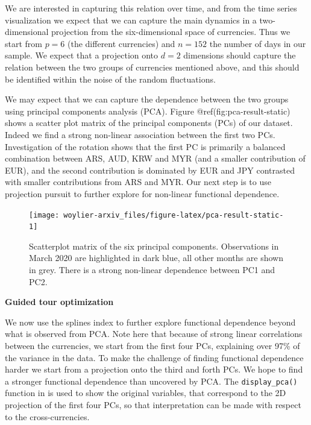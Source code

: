 \documentclass[
]{article}
\begin{document}
We are interested in capturing this relation over time, and from the
time series visualization we expect that we can capture the main
dynamics in a two-dimensional projection from the six-dimensional space
of currencies. Thus we start from \(p=6\) (the different currencies) and
\(n=152\) the number of days in our sample. We expect that a projection
onto \(d=2\) dimensions should capture the relation between the two
groups of currencies mentioned above, and this should be identified
within the noise of the random fluctuations.

We may expect that we can capture the dependence between the two groups
using principal components analysis (PCA). Figure
@ref(fig:pca-result-static) shows a scatter plot matrix of the principal
components (PCs) of our dataset. Indeed we find a strong non-linear
association between the first two PCs. Investigation of the rotation
shows that the first PC is primarily a balanced combination between ARS,
AUD, KRW and MYR (and a smaller contribution of EUR), and the second
contribution is dominated by EUR and JPY contrasted with smaller
contributions from ARS and MYR. Our next step is to use projection
pursuit to further explore for non-linear functional dependence.

\begin{figure}

{\centering \texttt{[image: woylier-arxiv\_files/figure-latex/pca-result-static-1]} 

}

\caption{Scatterplot matrix of the six principal components. Observations in March 2020 are highlighted in dark blue, all other months are shown in grey. There is a strong non-linear dependence between PC1 and PC2.}\label{fig:pca-result-static}
\end{figure}

\textbf{Guided tour optimization}

We now use the splines index to further explore functional dependence
beyond what is observed from PCA. Note here that because of strong
linear correlations between the currencies, we start from the first four
PCs, explaining over 97\% of the variance in the data. To make the
challenge of finding functional dependence harder we start from a
projection onto the third and forth PCs. We hope to find a stronger
functional dependence than uncovered by PCA. The \texttt{display\_pca()}
function in  is used to show the original variables, that
correspond to the 2D projection of the first four PCs, so that
interpretation can be made with respect to the cross-currencies.
\end{document}
